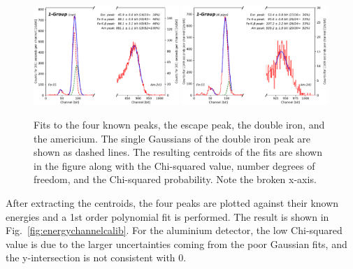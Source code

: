\begin{figure}[htbp]
  \includegraphics[width=0.49\textwidth,page=1]{graphics/channelfits.pdf}
  \includegraphics[width=0.49\textwidth,page=1]{graphics/aluchannelfits.pdf}
  \caption{Fits to the four known peaks, the escape peak, the double iron, and the americium. The single Gaussians of the double iron peak are shown as dashed lines. The resulting centroids of the fits are shown in the figure along with the Chi-squared value, number degrees of freedom, and the Chi-squared probability. Note the broken x-axis.}
  \label{fig:channelfits}
\end{figure}

After extracting the centroids, the four peaks are plotted against their known energies and a 1st order polynomial fit is performed. The result is shown in Fig.~\ref{fig:energychannelcalib}. For the aluminium detector, the low Chi-squared value is due to the larger uncertainties coming from the poor Gaussian fits, and the y-intersection is not consistent with 0.

